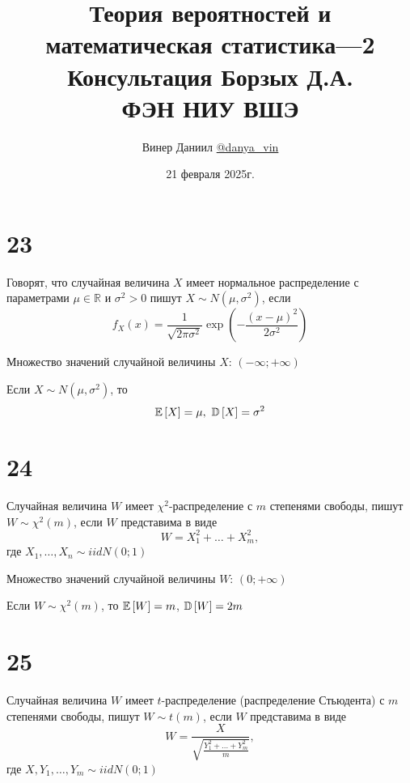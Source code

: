 \documentclass{article}
\title{\LARGE{Теория вероятностей и математическая статистика—2}\\
Консультация Борзых Д.А.\\
ФЭН НИУ ВШЭ}
\author{Винер Даниил  \href{https://t.me/danya_vin}{@danya\_vin}}
\date{21 февраля 2025г.}
\begin{document}
\maketitle
\setlength{\parindent}{15pt}
\setlength{\parskip}{2mm}
\section*{23} 
 Говорят, что случайная величина $X$ имеет нормальное распределение с параметрами $\mu\in\mathbb{R}$ и $\sigma^2>0$ пишут $X\sim N(\mu,\sigma^2)$, если
\begin{equation*}
    f_X(x)=\frac{1}{\sqrt{2\pi\sigma^2}}\exp\left(-\frac{(x-\mu)^2}{2\sigma^2}\right)
\end{equation*} 

Множество значений случайной величины $X$: $(-\infty;+\infty)$

\theorem Если $X\sim N(\mu,\sigma^2)$, то 
\begin{equation*}
    \matwait{X}=\mu,\ \dispersia{X}=\sigma^2
\end{equation*}


\section*{24}
 Случайная величина $W$ имеет $\chi^2$-распределение с $m$ степенями свободы, пишут\\
$W\sim\chi^2(m)$, если $W$ представима в виде
\begin{equation*}
    W=X_1^2+\ldots+X_m^2,
\end{equation*}
где $X_1,\ldots,X_n\sim iidN(0;1)$ 

Множество значений случайной величины $W$: $(0;+\infty)$

\theorem Если $W\sim\chi^2(m)$, то $\mathbb{E}\left[W\right]=m$, $\mathbb{D}\left[W\right]=2m$


\section*{25}
 Случайная величина $W$ имеет $t$-распределение (распределение Стьюдента) с $m$ степенями свободы, пишут $W\sim t(m)$, если $W$ представима в виде
\begin{equation*}
    W=\frac{X}{\sqrt{\frac{Y_1^2+\ldots+Y_m^2}{m}}},
\end{equation*}
где $X,Y_1,\ldots,Y_m\sim iidN(0;1)$
\end{document}
